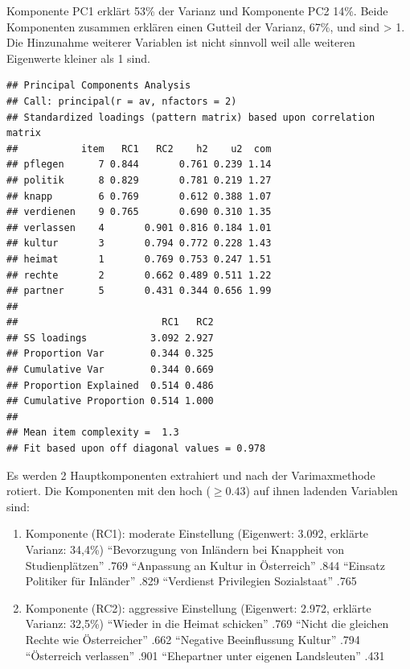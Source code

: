 \documentclass[]{article}
\newenvironment{Shaded}{\begin{snugshade}}{\end{snugshade}}
\newcommand{\KeywordTok}[1]{\textcolor[rgb]{0.13,0.29,0.53}{\textbf{{#1}}}}
\newcommand{\DataTypeTok}[1]{\textcolor[rgb]{0.13,0.29,0.53}{{#1}}}
\newcommand{\DecValTok}[1]{\textcolor[rgb]{0.00,0.00,0.81}{{#1}}}
\newcommand{\FloatTok}[1]{\textcolor[rgb]{0.00,0.00,0.81}{{#1}}}
\newcommand{\StringTok}[1]{\textcolor[rgb]{0.31,0.60,0.02}{{#1}}}
\newcommand{\OtherTok}[1]{\textcolor[rgb]{0.56,0.35,0.01}{{#1}}}
\newcommand{\NormalTok}[1]{{#1}}
\providecommand{\tightlist}{%
  \setlength{\itemsep}{0pt}\setlength{\parskip}{0pt}}
\begin{document}
Komponente PC1 erklärt 53\% der Varianz und Komponente PC2 14\%. Beide
Komponenten zusammen erklären einen Gutteil der Varianz, 67\%, und sind
\textgreater{} 1. Die Hinzunahme weiterer Variablen ist nicht sinnvoll
weil alle weiteren Eigenwerte kleiner als 1 sind.

\begin{Shaded}
\end{Shaded}

\begin{verbatim}
## Principal Components Analysis
## Call: principal(r = av, nfactors = 2)
## Standardized loadings (pattern matrix) based upon correlation matrix
##           item   RC1   RC2    h2    u2  com
## pflegen      7 0.844       0.761 0.239 1.14
## politik      8 0.829       0.781 0.219 1.27
## knapp        6 0.769       0.612 0.388 1.07
## verdienen    9 0.765       0.690 0.310 1.35
## verlassen    4       0.901 0.816 0.184 1.01
## kultur       3       0.794 0.772 0.228 1.43
## heimat       1       0.769 0.753 0.247 1.51
## rechte       2       0.662 0.489 0.511 1.22
## partner      5       0.431 0.344 0.656 1.99
## 
##                         RC1   RC2
## SS loadings           3.092 2.927
## Proportion Var        0.344 0.325
## Cumulative Var        0.344 0.669
## Proportion Explained  0.514 0.486
## Cumulative Proportion 0.514 1.000
## 
## Mean item complexity =  1.3
## Fit based upon off diagonal values = 0.978
\end{verbatim}

Es werden 2 Hauptkomponenten extrahiert und nach der Varimaxmethode
rotiert. Die Komponenten mit den hoch (\(\ge 0.43\)) auf ihnen ladenden
Variablen sind:

\begin{enumerate}
\def\labelenumi{\arabic{enumi}.}
\tightlist
\item
  Komponente (RC1): moderate Einstellung (Eigenwert: 3.092, erklärte
  Varianz: 34,4\%) ``Bevorzugung von Inländern bei Knappheit von
  Studienplätzen'' .769 ``Anpassung an Kultur in Österreich'' .844
  ``Einsatz Politiker für Inländer'' .829 ``Verdienst Privilegien
  Sozialstaat'' .765
\item
  Komponente (RC2): aggressive Einstellung (Eigenwert: 2.972, erklärte
  Varianz: 32,5\%) ``Wieder in die Heimat schicken'' .769 ``Nicht die
  gleichen Rechte wie Österreicher'' .662 ``Negative Beeinflussung
  Kultur'' .794 ``Österreich verlassen'' .901 ``Ehepartner unter eigenen
  Landsleuten'' .431
\end{enumerate}
\end{document}
